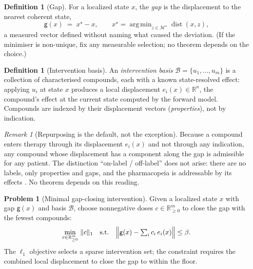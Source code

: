 \documentclass[11pt,a4paper]{article}
\theoremstyle{cfcthm}
\theoremstyle{definition}
\newtheorem{definition}[theorem]{Definition}
\newtheorem{problem}[theorem]{Problem}
\theoremstyle{remark}
\newtheorem{remark}[theorem]{Remark}
\newcommand{\R}{\mathbb{R}}
\newcommand{\Rp}{\R_{\ge 0}}
\newcommand{\Man}{\mathcal{M}}          %
\newcommand{\st}{x}                     %
\newcommand{\coh}{x^{\star}}            %
\newcommand{\Coh}{\Man^{\star}}         %
\newcommand{\flo}{\beta}                %
\newcommand{\gap}{\mathsf{g}}           %
\newcommand{\basis}{\mathcal{B}}        %
\newcommand{\intv}{u}                   %
\newcommand{\dose}{c}                   %
\newcommand{\norm}[1]{\lVert#1\rVert}
\newcommand{\set}[1]{\{#1\}}
\newcommand{\dist}{\operatorname{dist}}
\DeclareMathOperator*{\argmin}{arg\,min}
\begin{document}
\begin{definition}[Gap]
\label{def:gap}
For a localized state $\st$, the \emph{gap} is the displacement to the nearest
coherent state,
\begin{equation}
\gap(\st)\;=\;\coh-\st,\qquad\coh=\argmin_{z\in\Coh}\dist(\st,z),
\label{eq:gap}
\end{equation}
a measured vector defined without naming what caused the deviation. (If the
minimiser is non-unique, fix any measurable selection; no theorem depends on
the choice.)
\end{definition}

\begin{definition}[Intervention basis]
\label{def:basis}
An \emph{intervention basis} $\basis=\set{\intv_1,\dots,\intv_m}$ is a
collection of characterised compounds, each with a known state-resolved effect:
applying $\intv_i$ at state $\st$ produces a local displacement
$e_i(\st)\in\R^n$, the compound's effect at the current state computed by the
forward model. Compounds are indexed by their displacement vectors
(\emph{properties}), not by indication.
\end{definition}

\begin{remark}[Repurposing is the default, not the exception]
\label{rem:repurpose}
Because a compound enters therapy through its displacement $e_i(\st)$ and not
through any indication, any compound whose displacement has a component along
the gap is admissible for any patient. The distinction
``on-label / off-label'' does not arise: there are no labels, only properties
and gaps, and the pharmacopeia is addressable by its effects
\citep{pushpakom2019drug}. No theorem depends on this reading.
\end{remark}

\begin{problem}[Minimal gap-closing intervention]
\label{prob:closure}
Given a localized state $\st$ with gap $\gap(\st)$ and basis $\basis$, choose
nonnegative doses $\dose\in\Rp^{m}$ to close the gap with the fewest compounds:
\begin{equation}
\min_{\dose\in\Rp^{m}}\ \norm{\dose}_1
\quad\text{s.t.}\quad
\Bigl\lVert\gap(\st)-\textstyle\sum_i \dose_i\,e_i(\st)\Bigr\rVert\le\flo.
\label{eq:closure}
\end{equation}
The $\ell_1$ objective selects a sparse intervention set; the constraint
requires the combined local displacement to close the gap to within the floor.
\end{problem}
\end{document}
